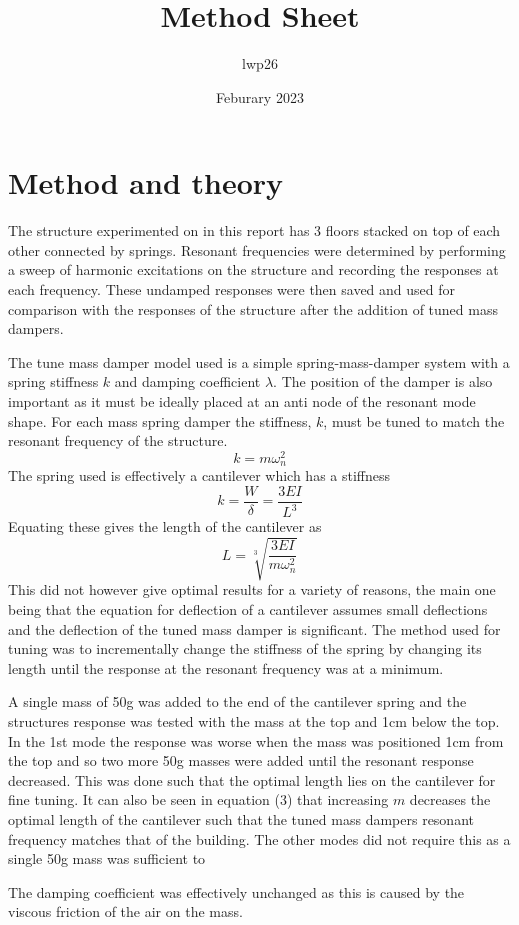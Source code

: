 \documentclass[8pt]{article}
\begin{document}
\title{Method Sheet}
\author{lwp26}
\date{Feburary 2023}
\maketitle

\newpage

\section{Method and theory}

The structure experimented on in this report has 3 floors stacked on top of each other connected by springs.
Resonant frequencies were determined by performing a sweep of harmonic excitations on the structure and recording the responses at each frequency.
These undamped responses were then saved and used for comparison with the responses of the structure after the addition of tuned mass dampers.

The tune mass damper model used is a simple spring-mass-damper system with a spring stiffness $k$ and damping coefficient $\lambda$.
The position of the damper is also important as it must be ideally placed at an anti node of the resonant mode shape.
For each mass spring damper the stiffness, $k$, must be tuned to match the resonant frequency of the structure.
\begin{equation}
    k = m\omega_n^2
\end{equation}
The spring used is effectively a cantilever which has a stiffness
\begin{equation}
    k = \frac{W}{\delta} = \frac{3EI}{L^3}
\end{equation}
Equating these gives the length of the cantilever as
\begin{equation}
    L = \sqrt[3]{\frac{3EI}{m\omega_n^2}}
\end{equation}
This did not however give optimal results for a variety of reasons, the main one being that the equation for deflection
of a cantilever assumes small deflections and the deflection of the tuned mass damper is significant.
The method used for tuning was to incrementally change the stiffness of the spring by changing its length until the response 
at the resonant frequency was at a minimum. 

A single mass of 50g was added to the end of the cantilever spring and the structures response was tested with the mass at the top and 1cm below the top.
In the 1st mode the response was worse when the mass was positioned 1cm from the top and so two more 50g masses were added until the resonant response decreased.
This was done such that the optimal length lies on the cantilever for fine tuning. It can also be seen in equation (3) that increasing $m$
decreases the optimal length of the cantilever such that the tuned mass dampers resonant frequency matches that of the building.
The other modes did not require this as a single 50g mass was sufficient to 

The damping coefficient was effectively unchanged as this is caused by the viscous friction of the air on the mass.
\end{document}
